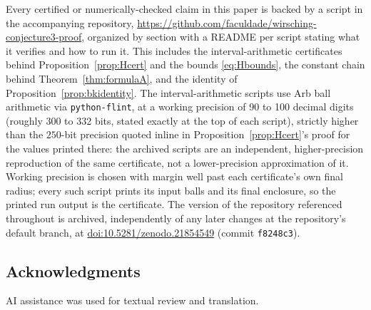 \documentclass[11pt]{amsart}
\theoremstyle{plain}
\theoremstyle{definition}
\theoremstyle{remark}
\begin{document}
Every certified or numerically-checked claim in this paper is backed by a script in the
accompanying repository, \url{https://github.com/faculdade/wirsching-conjecture3-proof}, organized
by section with a README per script stating what it verifies and how to run it. This includes the
interval-arithmetic certificates behind Proposition~\ref{prop:Hcert} and the bounds
\eqref{eq:Hbounds}, the constant chain behind Theorem~\ref{thm:formulaA}, and the identity of
Proposition~\ref{prop:bkidentity}. The interval-arithmetic scripts use Arb ball arithmetic via
\texttt{python-flint}, at a working precision of 90 to 100 decimal digits (roughly 300 to 332 bits,
stated exactly at the top of each script), strictly higher than the $250$-bit precision quoted
inline in Proposition~\ref{prop:Hcert}'s proof for the values printed there: the archived scripts
are an independent, higher-precision reproduction of the same certificate, not a lower-precision
approximation of it. Working precision is chosen with margin well past each certificate's own final
radius; every such script prints its input balls and its final enclosure, so the printed run output
is the certificate. The version of the repository referenced throughout is archived,
independently of any later changes at the repository's default branch, at
\href{https://doi.org/10.5281/zenodo.21854549}{doi:10.5281/zenodo.21854549} (commit
\texttt{f8248c3}).

\subsection*{Acknowledgments}
AI assistance was used for textual review and translation.
\end{document}
